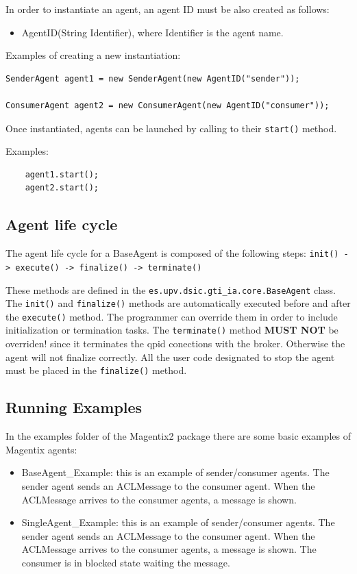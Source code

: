 In order to instantiate an agent, an agent ID must be also created as follows:
\begin{itemize}
 \item AgentID(String Identifier), where Identifier is the agent name.
\end{itemize}


Examples of creating a new instantiation:

\begin{lstlisting}
SenderAgent agent1 = new SenderAgent(new AgentID("sender"));

ConsumerAgent agent2 = new ConsumerAgent(new AgentID("consumer"));
\end{lstlisting}


Once instantiated, agents can be launched by calling to their \lstinline|start()| method.


Examples:

\begin{lstlisting}
    agent1.start();
    agent2.start();
\end{lstlisting}

\subsection{Agent life cycle}

The agent life cycle for a BaseAgent is composed of the following steps:
\lstinline|init() -> execute() -> finalize() -> terminate()|

These methods are defined in the  \lstinline|es.upv.dsic.gti_ia.core.BaseAgent| class. The \lstinline|init()| and \lstinline|finalize()| methods are automatically executed before and after the \lstinline|execute()| method. The programmer can  override  them in order to include initialization or termination tasks. The \lstinline|terminate()| method \textbf{MUST NOT} be overriden! since it terminates the qpid conections with the broker. Otherwise the agent will not finalize correctly. All the user code designated to stop the agent must be placed in the \lstinline|finalize()| method.


\subsection{Running Examples}

In the examples folder of the Magentix2 package there are some basic examples of Magentix agents:
\begin{itemize}

 \item BaseAgent\_Example: this is an example of sender/consumer agents. The sender agent sends an ACLMessage to the consumer agent. When the ACLMessage arrives to the consumer agents, a message is shown.

 \item SingleAgent\_Example: this is an example of sender/consumer agents. The sender agent sends an ACLMessage to the consumer agent. When the ACLMessage arrives to the consumer agents, a message is shown.
The consumer is in blocked state waiting the message.

\end{itemize}


